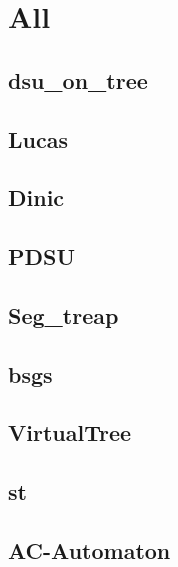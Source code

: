 \section{All}
\subsection{dsu\_on\_tree}
\raggedbottom
\hrulefill

\subsection{Lucas}
\raggedbottom
\hrulefill

\subsection{Dinic}
\raggedbottom
\hrulefill

\subsection{PDSU}
\raggedbottom
\hrulefill

\subsection{Seg\_treap}
\raggedbottom
\hrulefill

\subsection{bsgs}
\raggedbottom
\hrulefill

\subsection{VirtualTree}
\raggedbottom
\hrulefill

\subsection{st}
\raggedbottom
\hrulefill

\subsection{AC-Automaton}
\raggedbottom
\hrulefill


